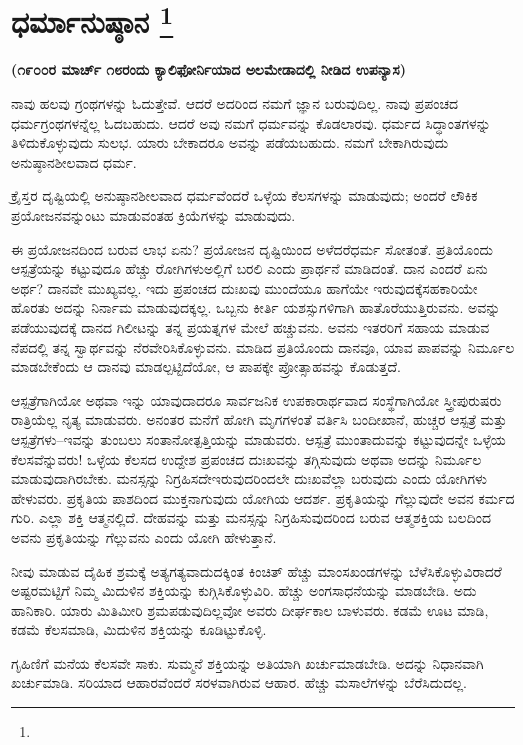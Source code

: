 
\vspace{-0.5cm}

\chapter[ಧರ್ಮಾನುಷ್ಠಾನ ]{ಧರ್ಮಾನುಷ್ಠಾನ \protect\footnote{}}

\begin{center}
\textbf{(೧೯೦೦ರ ಮಾರ್ಚ್​ ೧೮ರಂದು ಕ್ಯಾಲಿಫೋರ್ನಿಯಾದ ಅಲಮೇಡಾದಲ್ಲಿ ನೀಡಿದ\general{\break } ಉಪನ್ಯಾಸ)}
\end{center}

ನಾವು ಹಲವು ಗ್ರಂಥಗಳನ್ನು ಓದುತ್ತೇವೆ. ಆದರೆ ಅದರಿಂದ ನಮಗೆ ಜ್ಞಾನ ಬರುವುದಿಲ್ಲ. ನಾವು ಪ್ರಪಂಚದ ಧರ್ಮಗ್ರಂಥಗಳನ್ನೆಲ್ಲ ಓದಬಹುದು. ಆದರೆ ಅವು ನಮಗೆ ಧರ್ಮವನ್ನು ಕೊಡಲಾರವು. ಧರ್ಮದ ಸಿದ್ಧಾಂತಗಳನ್ನು ತಿಳಿದುಕೊಳ್ಳುವುದು ಸುಲಭ. ಯಾರು ಬೇಕಾದರೂ ಅವನ್ನು ಪಡೆಯಬಹುದು. ನಮಗೆ ಬೇಕಾಗಿರುವುದು ಅನುಷ್ಠಾನಶೀಲವಾದ ಧರ್ಮ.

ಕ್ರೈಸ್ತರ ದೃಷ್ಟಿಯಲ್ಲಿ ಅನುಷ್ಠಾನಶೀಲವಾದ ಧರ್ಮವೆಂದರೆ ಒಳ್ಳೆಯ ಕೆಲಸಗಳನ್ನು ಮಾಡುವುದು; ಅಂದರೆ ಲೌಕಿಕ ಪ್ರಯೋಜನವನ್ನುಂಟು ಮಾಡುವಂತಹ ಕ್ರಿಯೆಗಳನ್ನು ಮಾಡುವುದು.

ಈ ಪ್ರಯೋಜನದಿಂದ ಬರುವ ಲಾಭ ಏನು? ಪ್ರಯೋಜನ ದೃಷ್ಟಿಯಿಂದ ಅಳೆದರೆ\break ಧರ್ಮ ಸೋತಂತೆ. ಪ್ರತಿಯೊಂದು ಆಸ್ಪತ್ರೆಯನ್ನು ಕಟ್ಟುವುದೂ ಹೆಚ್ಚು ರೋಗಿಗಳು\break ಅಲ್ಲಿಗೆ ಬರಲಿ ಎಂದು ಪ್ರಾರ್ಥನೆ ಮಾಡಿದಂತೆ. ದಾನ ಎಂದರೆ ಏನು ಅರ್ಥ? ದಾನವೇ ಮುಖ್ಯವಲ್ಲ. ಇದು ಪ್ರಪಂಚದ ದುಃಖವು ಮುಂದೆಯೂ ಹಾಗೆಯೇ ಇರುವುದಕ್ಕೆ\break ಸಹಕಾರಿಯೇ ಹೊರತು ಅದನ್ನು ನಿರ್ನಾಮ ಮಾಡುವುದಕ್ಕಲ್ಲ. ಒಬ್ಬನು ಕೀರ್ತಿ ಯಶಸ್ಸುಗಳಿಗಾಗಿ ಹಾತೊರೆಯುತ್ತಿರುವನು. ಅವನ್ನು ಪಡೆಯುವುದಕ್ಕೆ ದಾನದ ಗಿಲೀಟನ್ನು ತನ್ನ ಪ್ರಯತ್ನಗಳ ಮೇಲೆ ಹಚ್ಚುವನು. ಅವನು ಇತರರಿಗೆ ಸಹಾಯ ಮಾಡುವ ನೆಪದಲ್ಲಿ ತನ್ನ ಸ್ವಾರ್ಥವನ್ನು ನೆರವೇರಿಸಿಕೊಳ್ಳುವನು. ಮಾಡಿದ ಪ್ರತಿಯೊಂದು ದಾನವೂ, ಯಾವ ಪಾಪವನ್ನು ನಿರ್ಮೂಲ ಮಾಡಬೇಕೆಂದು ಆ ದಾನವು ಮಾಡಲ್ಪಟ್ಟಿದೆಯೋ, ಆ ಪಾಪಕ್ಕೇ ಪ್ರೋತ್ಸಾಹವನ್ನು ಕೊಡುತ್ತದೆ.

ಆಸ್ಪತ್ರೆಗಾಗಿಯೋ ಅಥವಾ ಇನ್ನು ಯಾವುದಾದರೂ ಸಾರ್ವಜನಿಕ ಉಪಕಾರಾರ್ಥ\-ವಾದ ಸಂಸ್ಥೆಗಾಗಿಯೋ ಸ್ತ್ರೀಪುರುಷರು ರಾತ್ರಿಯೆಲ್ಲ ನೃತ್ಯ ಮಾಡುವರು. ಅನಂತರ ಮನೆಗೆ ಹೋಗಿ ಮೃಗಗಳಂತೆ ವರ್ತಿಸಿ ಬಂದೀಖಾನೆ, ಹುಚ್ಚರ ಆಸ್ಪತ್ರೆ ಮತ್ತು ಆಸ್ಪತ್ರೆಗಳು–ಇವನ್ನು ತುಂಬಲು ಸಂತಾನೋತ್ಪತ್ತಿಯನ್ನು ಮಾಡುವರು. ಆಸ್ಪತ್ರೆ ಮುಂತಾದುವನ್ನು ಕಟ್ಟುವುದನ್ನೇ ಒಳ್ಳೆಯ ಕೆಲಸವೆನ್ನುವರು! ಒಳ್ಳೆಯ ಕೆಲಸದ ಉದ್ದೇಶ ಪ್ರಪಂಚದ ದುಃಖವನ್ನು ತಗ್ಗಿಸುವುದು ಅಥವಾ ಅದನ್ನು ನಿರ್ಮೂಲ ಮಾಡುವುದಾಗಿರಬೇಕು. ಮನಸ್ಸನ್ನು ನಿಗ್ರಹಿಸದೇ\break ಇರುವುದರಿಂದಲೇ ದುಃಖವೆಲ್ಲಾ ಬರುವುದು ಎಂದು ಯೋಗಿಗಳು ಹೇಳುವರು. ಪ್ರಕೃತಿಯ ಪಾಶದಿಂದ ಮುಕ್ತನಾಗುವುದು ಯೋಗಿಯ ಆದರ್ಶ. ಪ್ರಕೃತಿಯನ್ನು ಗೆಲ್ಲುವುದೇ ಅವನ ಕರ್ಮದ ಗುರಿ. ಎಲ್ಲಾ ಶಕ್ತಿ ಆತ್ಮನಲ್ಲಿದೆ. ದೇಹವನ್ನು ಮತ್ತು ಮನಸ್ಸನ್ನು ನಿಗ್ರಹಿಸುವುದರಿಂದ ಬರುವ ಆತ್ಮಶಕ್ತಿಯ ಬಲದಿಂದ ಅವನು ಪ್ರಕೃತಿಯನ್ನು ಗೆಲ್ಲುವನು ಎಂದು ಯೋಗಿ ಹೇಳುತ್ತಾನೆ.

ನೀವು ಮಾಡುವ ದೈಹಿಕ ಶ್ರಮಕ್ಕೆ ಅತ್ಯಗತ್ಯವಾದುದಕ್ಕಿಂತ ಕಿಂಚಿತ್​ ಹೆಚ್ಚು ಮಾಂಸಖಂಡಗಳನ್ನು ಬೆಳೆಸಿಕೊಳ್ಳುವಿರಾದರೆ ಅಷ್ಟರಮಟ್ಟಿಗೆ ನಿಮ್ಮ ಮಿದುಳಿನ ಶಕ್ತಿಯನ್ನು ಕುಗ್ಗಿಸಿಕೊಳ್ಳುವಿರಿ. ಹೆಚ್ಚು ಅಂಗಸಾಧನೆಯನ್ನು ಮಾಡಬೇಡಿ. ಅದು ಹಾನಿಕಾರಿ. ಯಾರು ಮಿತಿಮೀರಿ ಶ್ರಮಪಡುವುದಿಲ್ಲವೋ ಅವರು ದೀರ್ಘಕಾಲ ಬಾಳುವರು. ಕಡಮೆ ಊಟ ಮಾಡಿ, ಕಡಮೆ ಕೆಲಸಮಾಡಿ, ಮಿದುಳಿನ ಶಕ್ತಿಯನ್ನು ಕೂಡಿಟ್ಟುಕೊಳ್ಳಿ.

ಗೃಹಿಣಿಗೆ ಮನೆಯ ಕೆಲಸವೇ ಸಾಕು. ಸುಮ್ಮನೆ ಶಕ್ತಿಯನ್ನು ಅತಿಯಾಗಿ ಖರ್ಚುಮಾಡಬೇಡಿ. ಅದನ್ನು ನಿಧಾನವಾಗಿ ಖರ್ಚುಮಾಡಿ. ಸರಿಯಾದ ಆಹಾರವೆಂದರೆ ಸರಳವಾಗಿರುವ ಆಹಾರ. ಹೆಚ್ಚು ಮಸಾಲೆಗಳನ್ನು ಬೆರೆಸಿದುದಲ್ಲ.

